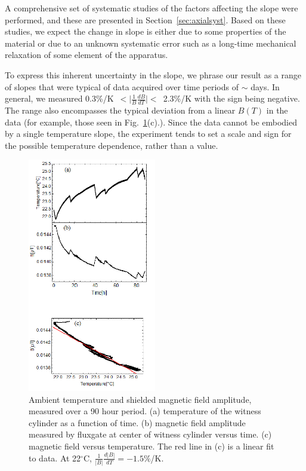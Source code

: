 A comprehensive set of systematic studies of the factors affecting the
slope were performed, and these are presented in
Section~\ref{sec:axialsyst}.  Based on these studies, we expect the
change in slope is either due to some properties of the material or
due to an unknown systematic error such as a long-time mechanical
relaxation of some element of the apparatus.

To express this inherent uncertainty in the slope, we phrase our
result as a range of slopes that were typical of data acquired over
time periods of $\sim$ days.  In general, we measured
0.3\%/K~$<\vert\frac{1}{B}\frac{dB}{dT}\vert<$~2.3\%/K with the sign
being negative.  The range also encompasses the typical deviation from
a linear $B(T)$ in the data (for example, those seen in
Fig.~\ref{fig:B_vs_Temp}(c).).  Since the data cannot be embodied by a
single temperature slope, the experiment tends to set a scale and sign
for the possible temperature dependence, rather than a value.

\begin{figure}[h!]
\begin{center}
   \includegraphics[width=0.5\textwidth]{B_vs_T.png}
    \caption{Ambient temperature and shielded magnetic field
      amplitude, measured over a 90 hour period. (a) temperature of
      the witness cylinder as a function of time.  (b) magnetic field
      amplitude measured by fluxgate at center of witness cylinder
      versus time.  (c) magnetic field versus temperature. The red
      line in (c) is a linear fit to data. At 22$^\circ$C,
      $\frac{1}{|B|}\frac{d|B|}{dT}=-1.5\%$/K.}
    \label{fig:B_vs_Temp}
    \end{center}
\end{figure} 

